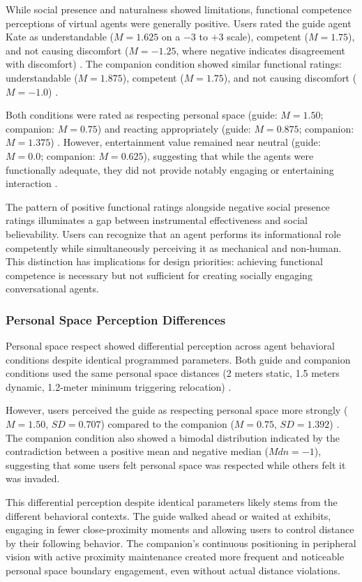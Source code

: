 \documentclass[manuscript,anonymous,sigconf]{acmart}
\begin{document}
While social presence and naturalness showed limitations, functional competence perceptions of virtual agents were generally positive. Users rated the guide agent Kate as understandable ($M = 1.625$ on a $-3$ to $+3$ scale), competent ($M = 1.75$), and not causing discomfort ($M = -1.25$, where negative indicates disagreement with discomfort) \cite{A82}. The companion condition showed similar functional ratings: understandable ($M = 1.875$), competent ($M = 1.75$), and not causing discomfort ($M = -1.0$) \cite{A82}.

Both conditions were rated as respecting personal space (guide: $M = 1.50$; companion: $M = 0.75$) and reacting appropriately (guide: $M = 0.875$; companion: $M = 1.375$) \cite{A82}. However, entertainment value remained near neutral (guide: $M = 0.0$; companion: $M = 0.625$), suggesting that while the agents were functionally adequate, they did not provide notably engaging or entertaining interaction \cite{A82}.

The pattern of positive functional ratings alongside negative social presence ratings illuminates a gap between instrumental effectiveness and social believability. Users can recognize that an agent performs its informational role competently while simultaneously perceiving it as mechanical and non-human. This distinction has implications for design priorities: achieving functional competence is necessary but not sufficient for creating socially engaging conversational agents.

\subsubsection{Personal Space Perception Differences}

Personal space respect showed differential perception across agent behavioral conditions despite identical programmed parameters. Both guide and companion conditions used the same personal space distances (2 meters static, 1.5 meters dynamic, 1.2-meter minimum triggering relocation) \cite{A82}.

However, users perceived the guide as respecting personal space more strongly ($M = 1.50$, $SD = 0.707$) compared to the companion ($M = 0.75$, $SD = 1.392$) \cite{A82}. The companion condition also showed a bimodal distribution indicated by the contradiction between a positive mean and negative median ($Mdn = -1$), suggesting that some users felt personal space was respected while others felt it was invaded.

This differential perception despite identical parameters likely stems from the different behavioral contexts. The guide walked ahead or waited at exhibits, engaging in fewer close-proximity moments and allowing users to control distance by their following behavior. The companion's continuous positioning in peripheral vision with active proximity maintenance created more frequent and noticeable personal space boundary engagement, even without actual distance violations.
\end{document}
